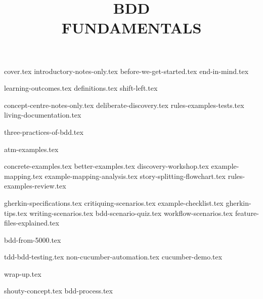 \documentclass[a4paper,12pt]{report}
\title{BDD\\FUNDAMENTALS}
\begin{document}
{cover.tex}
{introductory-notes-only.tex}
{before-we-get-started.tex}
{end-in-mind.tex}

{learning-outcomes.tex}
{definitions.tex}
{shift-left.tex}

{concept-centre-notes-only.tex}
{deliberate-discovery.tex}
{rules-examples-tests.tex}
{living-documentation.tex}

{three-practices-of-bdd.tex}


{atm-examples.tex}

{concrete-examples.tex}
{better-examples.tex}
{discovery-workshop.tex}
{example-mapping.tex} 
{example-mapping-analysis.tex}
{story-splitting-flowchart.tex}
{rules-examples-review.tex} 

{gherkin-specifications.tex}
{critiquing-scenarios.tex}
{example-checklist.tex}
{gherkin-tips.tex}
{writing-scenarios.tex}
{bdd-scenario-quiz.tex}
{workflow-scenarios.tex}
{feature-files-explained.tex}

{bdd-from-5000.tex}

{tdd-bdd-testing.tex}
{non-cucumber-automation.tex}
{cucumber-demo.tex}

{wrap-up.tex}

{shouty-concept.tex}
{bdd-process.tex}
\end{document}
